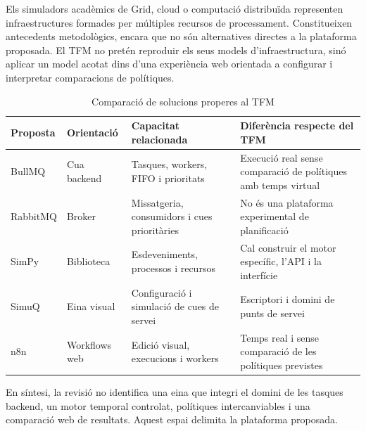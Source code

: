 Els simuladors acadèmics de Grid, cloud o computació distribuïda representen
infraestructures formades per múltiples recursos de processament. Constitueixen
antecedents metodològics, encara que no són alternatives directes a la
plataforma proposada. El TFM no pretén reproduir els seus models
d'infraestructura, sinó aplicar un model acotat dins d'una experiència web
orientada a configurar i interpretar comparacions de polítiques.

\begin{table}[htbp]
  \centering
  \caption{Comparació de solucions properes al TFM}
  \label{tab:eines}
  \begin{tabularx}{\textwidth}{@{}p{1.8cm}p{2.1cm}X X@{}}
    \toprule
    Proposta & Orientació & Capacitat relacionada & Diferència respecte del TFM \\
    \midrule
    BullMQ & Cua backend & Tasques, workers, FIFO i prioritats & Execució real sense comparació de polítiques amb temps virtual \\
    RabbitMQ & Broker & Missatgeria, consumidors i cues prioritàries & No és una plataforma experimental de planificació \\
    SimPy & Biblioteca & Esdeveniments, processos i recursos & Cal construir el motor específic, l'API i la interfície \\
    SimuQ & Eina visual & Configuració i simulació de cues de servei & Escriptori i domini de punts de servei \\
    n8n & Workflows web & Edició visual, execucions i workers & Temps real i sense comparació de les polítiques previstes \\
    \bottomrule
  \end{tabularx}
\end{table}

En síntesi, la revisió no identifica una eina que integri el domini de les
tasques backend, un motor temporal controlat, polítiques intercanviables i una
comparació web de resultats. Aquest espai delimita la plataforma proposada.
